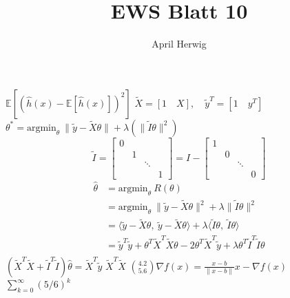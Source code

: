 \documentclass[draft]{article}
\title{EWS Blatt 10}
\author{April Herwig}
\begin{document}
\maketitle

$\mathbb{E}\left[ \left( \hat{h}(x) - \mathbb{E}\left[ \hat{h}(x) \right] \right) ^2 \right]$
$ \tilde{X} = [1\quad X], \quad\tilde{y}^T = [1\quad y^T] $
$ \theta ^{*} = \text{argmin}_\theta\  \| \tilde{y} - \tilde{X}\theta \| + \lambda\left(\| \tilde{I}\theta \|^2 \right)  $
\[
    \tilde{I}=\begin{bmatrix}
        0 & & & \\
        & 1 & & \\
        & & \ddots & \\
        & & & 1
    \end{bmatrix} = I - \begin{bmatrix}
        1 & & & \\
        & 0 & & \\
        & & \ddots & \\
        & & & 0 
    \end{bmatrix}
\]
\begin{align*}
    \hat{\theta} &= \text{argmin}_\theta\ R(\theta) \\
    &= \text{argmin}_\theta\ \| \tilde{y} - \tilde{X}\theta \|^2 + \lambda\| \tilde{I}\theta \| ^2 \\
    &= \langle \tilde{y} - \tilde{X}\theta,\ \tilde{y} - \tilde{X}\theta \rangle + \lambda\langle\tilde{I}\theta,\ \tilde{I}\theta\rangle \\
    &= \tilde{y}^T \tilde{y} +\theta^T\tilde{X}^T\tilde{X}\theta - 2\theta^T\tilde{X}^T\tilde{y} + \lambda\theta^T\tilde{I}^T\tilde{I}\theta \\
\end{align*}
$ \left(\tilde{X}^T\tilde{X} + \tilde{I}^T\tilde{I}\right)\hat{\theta} = \tilde{X}^T\tilde{y} $
$ \tilde{X}^T\tilde{X} $
$ \binom{4.2}{5.6}  \nabla f(x) = \frac{x - b}{\| x - b \|} x - \nabla f(x) $
$ \sum_{k = 0}^{\infty} (5/6)^k  $
\end{document}
